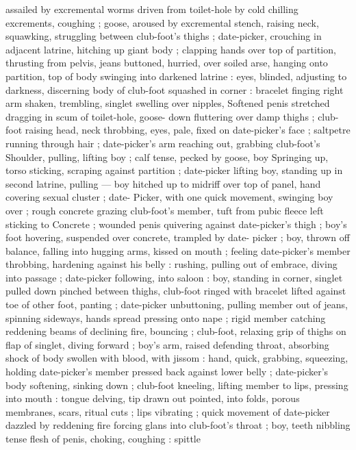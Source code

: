 assailed by excremental worms driven from toilet-hole by cold 
chilling excrements, coughing ; goose, aroused by excremental 
stench, raising neck, squawking, struggling between club-foot's 
thighs ; date-picker, crouching in adjacent latrine, hitching up giant 
body ; clapping hands over top of partition, thrusting from pelvis, 
jeans buttoned, hurried, over soiled arse, hanging onto partition, top 
of body swinging into darkened latrine : eyes, blinded, adjusting to 
darkness, discerning body of club-foot squashed in corner : bracelet 
finging right arm shaken, trembling, singlet swelling over nipples, 
Softened penis stretched dragging in scum of toilet-hole, goose- 
down fluttering over damp thighs ; club-foot raising head, neck 
throbbing, eyes, pale, fixed on date-picker's face ; saltpetre running 
through hair ; date-picker's arm reaching out, grabbing club-foot's 
Shoulder, pulling, lifting boy ; calf tense, pecked by goose, boy 
Springing up, torso sticking, scraping against partition ; date-picker 
lifting boy, standing up in second latrine, pulling --- boy hitched up 
to midriff over top of panel, hand covering sexual cluster ; date- 
Picker, with one quick movement, swinging boy over ; rough concrete 
grazing club-foot's member, tuft from pubic fleece left sticking to 
Concrete ; wounded penis quivering against date-picker's thigh ; 
boy's foot hovering, suspended over concrete, trampled by date- 
picker ; boy, thrown off balance, falling into hugging arms, kissed on 
mouth ; feeling date-picker's member throbbing, hardening against 
his belly : rushing, pulling out of embrace, diving into passage ; 
date-picker following, into saloon : boy, standing in corner, singlet 
pulled down pinched between thighs, club-foot ringed with bracelet 
lifted against toe of other foot, panting ; date-picker unbuttoning, 
pulling member out of jeans, spinning sideways, hands spread 
pressing onto nape ; rigid member catching reddening beams of 
declining fire, bouncing ; club-foot, relaxing grip of thighs on flap of 
singlet, diving forward ; boy's arm, raised defending throat, 
absorbing shock of body swollen with blood, with jissom : hand, 
quick, grabbing, squeezing, holding date-picker's member pressed 
back against lower belly ; date-picker's body softening, sinking down 
; club-foot kneeling, lifting member to lips, pressing into mouth : 
tongue delving, tip drawn out pointed, into folds, porous membranes, 
scars, ritual cuts ; lips vibrating ; quick movement of date-picker 
dazzled by reddening fire forcing glans into club-foot's throat ; boy, 
teeth nibbling tense flesh of penis, choking, coughing : spittle 
